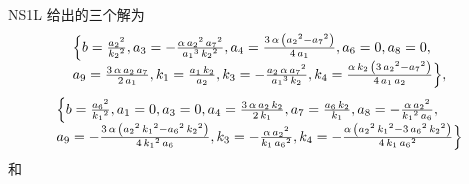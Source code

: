 NS1L 给出的三个解为
\begin{equation}
\renewcommand{\arraystretch}{1.2}
\begin{array}{l}  
\dbrace{
b=\frac{{{{a}_{2}}}^{2}}{{{{k}_{2}}}^{2}},
{{a}_{3}}=-\frac{\alpha\,{{{a}_{2}}}^{2}\,{{{a}_{7}}}^{2}}{{{{a}_{1}}}^{3}\,{{{k}_{2}}}^{2}},
{{a}_{4}}=\frac{3\,\alpha\,\left( {{{a}_{2}}}^{2}-{{{a}_{7}}}^{2}\right) }{4\,{{a}_{1}}},
{{a}_{6}}=0,
{{a}_{8}}=0,\\
{{a}_{9}}=\frac{3\,\alpha\,{{a}_{2}}\,{{a}_{7}}}{2\,{{a}_{1}}},
{{k}_{1}}=\frac{{{a}_{1}}\,{{k}_{2}}}{{{a}_{2}}},
{{k}_{3}}=-\frac{{{a}_{2}}\,\alpha\,{{{a}_{7}}}^{2}}{{{{a}_{1}}}^{3}\,{{k}_{2}}},
{{k}_{4}}=\frac{\alpha\,{{k}_{2}}\,\left( 3\,{{{a}_{2}}}^{2}-{{{a}_{7}}}^{2}\right) }{4\,{{a}_{1}}\,{{a}_{2}}}
},
\end{array}
\label{1S1L-2}
\end{equation}
\begin{equation}
\renewcommand{\arraystretch}{1.2}
\begin{array}{l} 
\dbrace{ 
b=\frac{{{{a}_{6}}}^{2}}{{{{k}_{1}}}^{2}},
{{a}_{1}}=0,
{{a}_{3}}=0,
{{a}_{4}}=\frac{3\,\alpha\,{{a}_{2}}\,{{k}_{2}}}{2\,{{k}_{1}}},
{{a}_{7}}=\frac{{{a}_{6}}\,{{k}_{2}}}{{{k}_{1}}},
{{a}_{8}}=-\frac{\alpha\,{{{a}_{2}}}^{2}}{{{{k}_{1}}}^{2}\,{{a}_{6}}},\\
{{a}_{9}}=-\frac{3\,\alpha\,\left( {{{a}_{2}}}^{2}\,{{{k}_{1}}}^{2}-{{{a}_{6}}}^{2}\,{{{k}_{2}}}^{2}\right) }{4\,{{{k}_{1}}}^{2}\,{{a}_{6}}},
{{k}_{3}}=-\frac{\alpha\,{{{a}_{2}}}^{2}}{{{k}_{1}}\,{{{a}_{6}}}^{2}},
{{k}_{4}}=-\frac{\alpha\,\left( {{{a}_{2}}}^{2}\,{{{k}_{1}}}^{2}-3\,{{{a}_{6}}}^{2}\,{{{k}_{2}}}^{2}\right) }{4\,{{k}_{1}}\,{{{a}_{6}}}^{2}}
}
\end{array}
\label{1S1L-3}
\end{equation}
和
